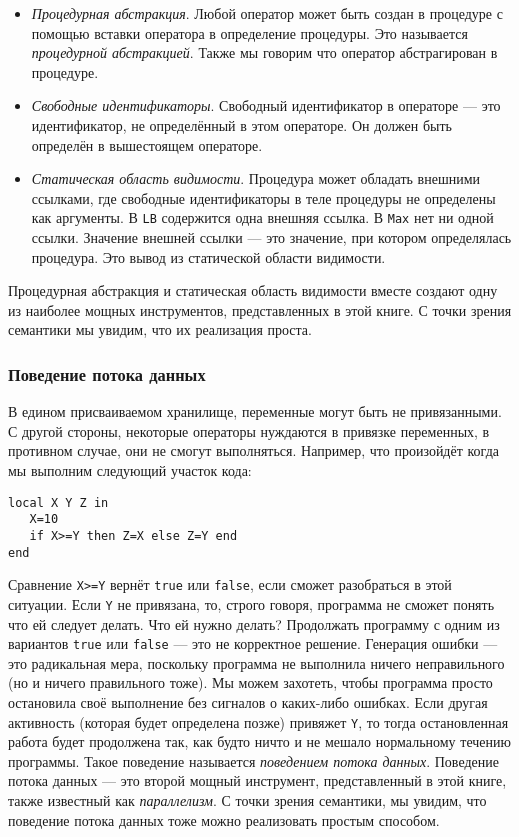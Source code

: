 \begin{itemize}
\item{\emph{Процедурная абстракция}. Любой оператор может быть создан в процедуре с помощью вставки оператора в определение процедуры. Это называется \emph{процедурной абстракцией}. Также мы говорим что оператор абстрагирован в процедуре.}

\item{\emph{Свободные идентификаторы}. Свободный идентификатор в операторе --- это идентификатор, не определённый в этом операторе. Он должен быть определён в вышестоящем операторе.}

\item{\emph{Статическая область видимости}. Процедура может обладать внешними ссылками, где свободные идентификаторы в теле процедуры не определены как аргументы. В \lstinline|LB| содержится одна внешняя ссылка. В \lstinline|Max| нет ни одной ссылки. Значение внешней ссылки --- это значение, при котором определялась процедура. Это вывод из статической области видимости.}
\end{itemize}

Процедурная абстракция и статическая область видимости вместе создают одну из наиболее мощных инструментов, представленных в этой книге. С точки зрения семантики мы увидим, что их реализация проста.

\subsubsection{Поведение потока данных}

В едином присваиваемом хранилище, переменные могут быть не привязанными. С другой стороны, некоторые операторы нуждаются в привязке переменных, в противном случае, они не смогут выполняться. Например, что произойдёт когда мы выполним следующий участок кода:

\begin{lstlisting}
local X Y Z in
   X=10
   if X>=Y then Z=X else Z=Y end
end
\end{lstlisting}

Сравнение \lstinline|X>=Y| вернёт \lstinline|true| или \lstinline|false|, если сможет разобраться в этой ситуации. Если \lstinline|Y| не привязана, то, строго говоря, программа не сможет понять что ей следует делать. Что ей нужно делать? Продолжать программу с одним из вариантов \lstinline|true| или \lstinline|false| --- это не корректное решение. Генерация ошибки --- это радикальная мера, поскольку программа не выполнила ничего неправильного (но и ничего правильного тоже). Мы можем захотеть, чтобы программа просто остановила своё выполнение без сигналов о каких-либо ошибках. Если другая активность (которая будет определена позже) привяжет \lstinline|Y|, то тогда остановленная работа будет продолжена так, как будто ничто и не мешало нормальному течению программы. Такое поведение называется \emph{поведением потока данных}. Поведение потока данных --- это второй мощный инструмент, представленный в этой книге, также известный как \emph{параллелизм}. С точки зрения семантики, мы увидим, что поведение потока данных тоже можно реализовать простым способом.

